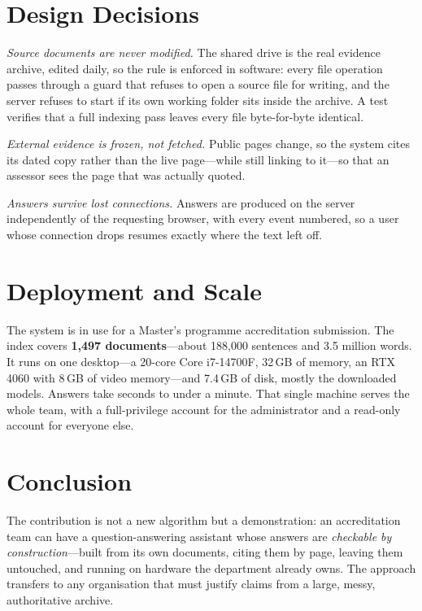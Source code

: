 \documentclass[conference]{IEEEtran}
\begin{document}
\section{Design Decisions}

\emph{Source documents are never modified.} The shared drive is the real
evidence archive, edited daily, so the rule is enforced in software: every file
operation passes through a guard that refuses to open a source file for writing,
and the server refuses to start if its own working folder sits inside the
archive. A test verifies that a full indexing pass leaves every file
byte-for-byte identical.

\emph{External evidence is frozen, not fetched.} Public pages change, so the
system cites its dated copy rather than the live page---while still linking to
it---so that an assessor sees the page that was actually quoted.

\emph{Answers survive lost connections.} Answers are produced on the server
independently of the requesting browser, with every event numbered, so a user
whose connection drops resumes exactly where the text left off.

\section{Deployment and Scale}

The system is in use for a Master's programme accreditation submission. The
index covers \textbf{1{,}497 documents}---about 188{,}000 sentences and 3.5
million words. It runs on one desktop---a 20-core Core i7-14700F, 32\,GB of
memory, an RTX 4060 with 8\,GB of video memory---and 7.4\,GB of disk, mostly the
downloaded models. Answers take seconds to under a minute. That single machine serves the whole team,
with a full-privilege account for the administrator and a read-only account for
everyone else.

\section{Conclusion}

The contribution is not a new algorithm but a demonstration: an accreditation
team can have a question-answering assistant whose answers are \emph{checkable
by construction}---built from its own documents, citing them by page, leaving
them untouched, and running on hardware the department already owns. The
approach transfers to any organisation that must justify claims from a large,
messy, authoritative archive.
\end{document}
